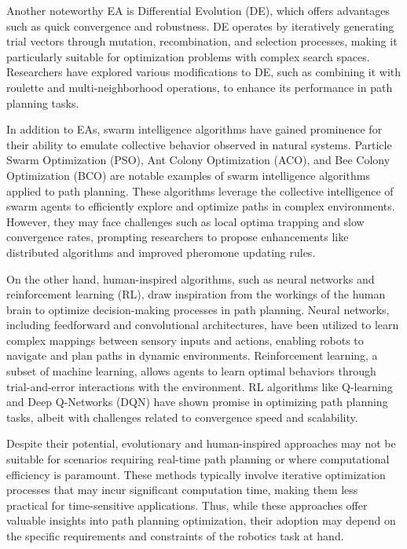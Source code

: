 \vspace*{6mm}


Another noteworthy EA is Differential Evolution (DE), which offers advantages such as quick convergence and robustness. DE operates by iteratively generating trial vectors through mutation, recombination, and selection processes, making it particularly suitable for optimization problems with complex search spaces. Researchers have explored various modifications to DE, such as combining it with roulette and multi-neighborhood operations, to enhance its performance in path planning tasks.

\vspace*{6mm}


In addition to EAs, swarm intelligence algorithms have gained prominence for their ability to emulate collective behavior observed in natural systems. Particle Swarm Optimization (PSO), Ant Colony Optimization (ACO), and Bee Colony Optimization (BCO) are notable examples of swarm intelligence algorithms applied to path planning. These algorithms leverage the collective intelligence of swarm agents to efficiently explore and optimize paths in complex environments. However, they may face challenges such as local optima trapping and slow convergence rates, prompting researchers to propose enhancements like distributed algorithms and improved pheromone updating rules.

\vspace*{6mm}


On the other hand, human-inspired algorithms, such as neural networks and reinforcement learning (RL), draw inspiration from the workings of the human brain to optimize decision-making processes in path planning. Neural networks, including feedforward and convolutional architectures, have been utilized to learn complex mappings between sensory inputs and actions, enabling robots to navigate and plan paths in dynamic environments. Reinforcement learning, a subset of machine learning, allows agents to learn optimal behaviors through trial-and-error interactions with the environment. RL algorithms like Q-learning and Deep Q-Networks (DQN) have shown promise in optimizing path planning tasks, albeit with challenges related to convergence speed and scalability.

\vspace*{6mm}


Despite their potential, evolutionary and human-inspired approaches may not be suitable for scenarios requiring real-time path planning or where computational efficiency is paramount. These methods typically involve iterative optimization processes that may incur significant computation time, making them less practical for time-sensitive applications. Thus, while these approaches offer valuable insights into path planning optimization, their adoption may depend on the specific requirements and constraints of the robotics task at hand.



